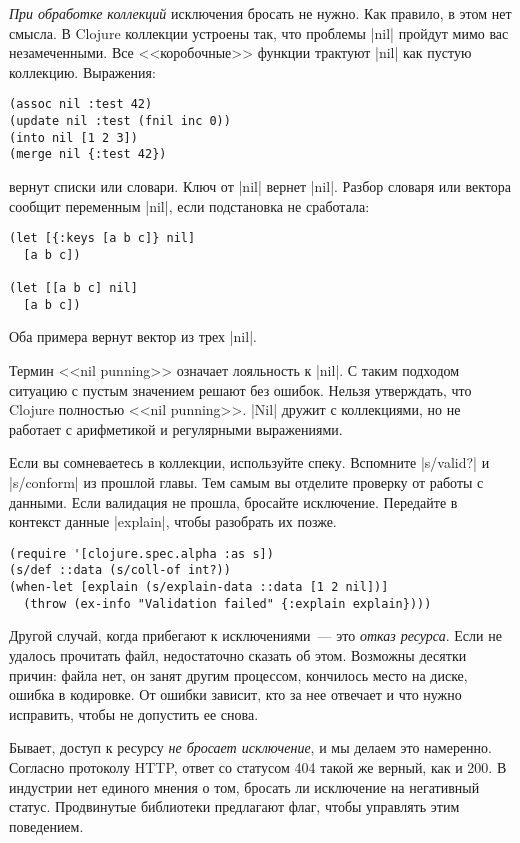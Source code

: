 \emph{При обработке коллекций} исключения бросать не нужно. Как правило, в этом
нет смысла. В Clojure коллекции устроены так, что проблемы \spverb|nil| пройдут
мимо вас незамеченными. Все <<коробочные>> функции трактуют \spverb|nil| как
пустую коллекцию. Выражения:

\begin{verbatim}
(assoc nil :test 42)
(update nil :test (fnil inc 0))
(into nil [1 2 3])
(merge nil {:test 42})
\end{verbatim}

\noindent
вернут списки или словари. Ключ от \spverb|nil| вернет \spverb|nil|. Разбор
словаря или вектора сообщит переменным \spverb|nil|, если подстановка не
сработала:

\begin{verbatim}
(let [{:keys [a b c]} nil]
  [a b c])

(let [[a b c] nil]
  [a b c])
\end{verbatim}

\noindent
Оба примера вернут вектор из трех \spverb|nil|.

Термин <<nil punning>> означает лояльность к \spverb|nil|. С таким подходом
ситуацию с пустым значением решают без ошибок. Нельзя утверждать, что Clojure
полностью <<nil punning>>. \spverb|Nil| дружит с коллекциями, но не работает с
арифметикой и регулярными выражениями.


Если вы сомневаетесь в коллекции, используйте спеку. Вспомните \spverb|s/valid?|
и \spverb|s/conform| из прошлой главы. Тем самым вы отделите проверку от работы
с данными. Если валидация не прошла, бросайте исключение. Передайте в контекст
данные \spverb|explain|, чтобы разобрать их позже.

\begin{verbatim}
(require '[clojure.spec.alpha :as s])
(s/def ::data (s/coll-of int?))
(when-let [explain (s/explain-data ::data [1 2 nil])]
  (throw (ex-info "Validation failed" {:explain explain})))
\end{verbatim}

Другой случай, когда прибегают к исключениями~--- это \emph{отказ ресурса}. Если
не удалось прочитать файл, недостаточно сказать об этом. Возможны десятки
причин: файла нет, он занят другим процессом, кончилось место на диске, ошибка в
кодировке. От ошибки зависит, кто за нее отвечает и что нужно исправить, чтобы
не допустить ее снова.

Бывает, доступ к ресурсу \emph{не бросает исключение}, и мы делаем это
намеренно. Согласно протоколу HTTP, ответ со статусом 404 такой же верный, как и
200. В индустрии нет единого мнения о том, бросать ли исключение на негативный
статус. Продвинутые библиотеки предлагают флаг, чтобы управлять этим поведением.


